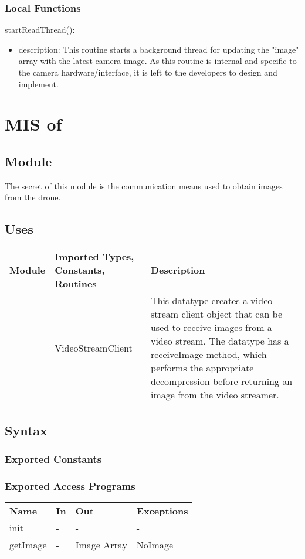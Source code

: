 \documentclass[12pt, titlepage]{article}
\begin{document}
\subsubsection{Local Functions}
\noindent startReadThread():
\begin{itemize}
\item description: This routine starts a background thread for updating the "image" array with the latest camera image. As this routine is internal and specific to the camera hardware/interface, it is left to the developers to design and implement. 
\end{itemize}
\newpage



\section{MIS of } \label{MIS_OPERATOR_CAMERA} 
\subsection{Module}
The secret of this module is the communication means used to obtain images from the drone.
\subsection{Uses}
\begin{center}
\begin{tabular}{p{2 cm} p{5cm} p{6.5cm} } 
\hline
\textbf{Module} & \textbf{Imported Types, Constants, Routines} & \textbf{Description} \\
\nameref{GStreamer} & VideoStreamClient & This datatype creates a video stream client object that can be used to receive images from a video stream. The datatype has a receiveImage method, which performs the appropriate decompression before returning an image from the video streamer. \\
\hline
\hline
\end{tabular}
\end{center}
\subsection{Syntax}
\subsubsection{Exported Constants}
\subsubsection{Exported Access Programs}
\begin{center}
\begin{tabular}{p{3.5cm} p{2.5cm} p{2.5cm} p{5cm}} 
\hline
\textbf{Name} & \textbf{In} & \textbf{Out} & \textbf{Exceptions} \\
init & - & - & - \\
getImage & - & Image Array & NoImage \\
\hline
\hline
\end{tabular}
\end{center}
\end{document}
